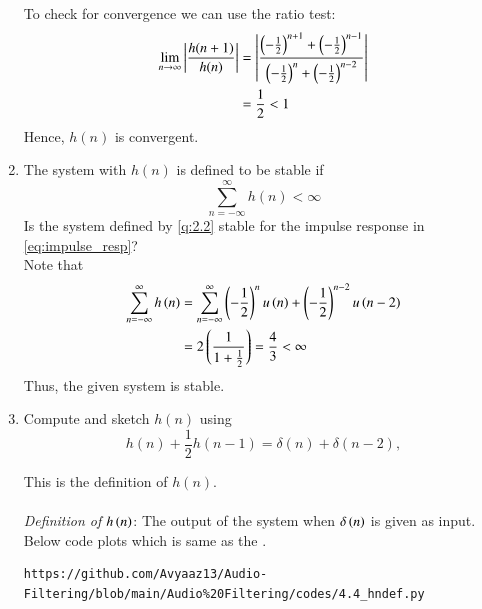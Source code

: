 \documentclass[journal,12pt,twocolumn]{IEEEtran}
\theoremstyle{remark}
\renewcommand\thesection{\arabic{section}}
\numberwithin{equation}{subsection}
\begin{document}
\begin{enumerate}[label=\thesection.\arabic*]
To check for convergence we can use the ratio test:
\begin{align}
    \lim_{n \to \infty}\left\vert\frac{h(n + 1)}{h(n)}\right\vert &= \left\vert\frac{\left(-\frac{1}{2}\right)^{n+1} + \left(-\frac{1}{2}\right)^{n-1}}{\left(-\frac{1}{2}\right)^{n} + \left(-\frac{1}{2}\right)^{n-2}}\right\vert\\
    &= \frac{1}{2} < 1 \label{eq:5.5}
\end{align}
Hence, $h(n)$ is convergent.
\item The system with $h(n)$ is defined to be stable if
\begin{equation}
\sum_{n=-\infty}^{\infty}h(n) < \infty \label{eq:stb_condn}
\end{equation}
Is the system defined by \eqref{q:2.2} stable for the impulse response in \eqref{eq:impulse_resp}?\\
\solution Note that
\begin{align}
	\sum_{n = -\infty}^{\infty}h\left(n\right) &= \sum_{n = -\infty}^{\infty}
	\left(-\frac{1}{2}\right)^nu\left(n\right) + \left(-\frac{1}{2}\right)^{n - 2}u\left(n - 2\right) \\
										 &= 2\left(\frac{1}{1 + \frac{1}{2}}\right) = \frac{4}{3} < \infty
\end{align}
Thus, the given system is stable.
\item 
Compute and sketch $h(n)$ using 
\begin{equation}
\label{eq:iir_filter_h}
h(n) + \frac{1}{2}h(n-1) = \delta(n) + \delta(n-2), 
\end{equation}

This is the definition of $h(n)$.
\\
\solution\\
{\em Definition of $h\left(n\right)$}: The output of the system when $\delta\left(n\right)$ is given as input.\\

Below code plots  which is same as the . 

\begin{lstlisting}
https://github.com/Avyaaz13/Audio-Filtering/blob/main/Audio%20Filtering/codes/4.4_hndef.py
\end{lstlisting}


\end{enumerate}
\end{document}

